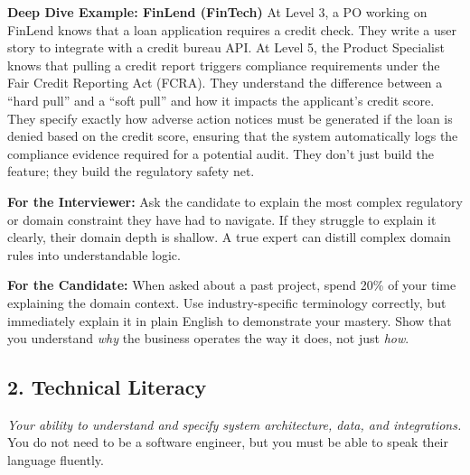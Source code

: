 \documentclass[
  11pt,
  openany,
  oneside]{book}
\renewenvironment{quote}{\begin{customquote}}{\end{customquote}}
\begin{document}
\textbf{Deep Dive Example: FinLend (FinTech)} At Level 3, a PO working
on FinLend knows that a loan application requires a credit check. They
write a user story to integrate with a credit bureau API. At Level 5,
the Product Specialist knows that pulling a credit report triggers
compliance requirements under the Fair Credit Reporting Act (FCRA). They
understand the difference between a ``hard pull'' and a ``soft pull''
and how it impacts the applicant's credit score. They specify exactly
how adverse action notices must be generated if the loan is denied based
on the credit score, ensuring that the system automatically logs the
compliance evidence required for a potential audit. They don't just
build the feature; they build the regulatory safety net.

\begin{quote}
\textbf{For the Interviewer:} Ask the candidate to explain the most
complex regulatory or domain constraint they have had to navigate. If
they struggle to explain it clearly, their domain depth is shallow. A
true expert can distill complex domain rules into understandable logic.
\end{quote}

\begin{quote}
\textbf{For the Candidate:} When asked about a past project, spend 20\%
of your time explaining the domain context. Use industry-specific
terminology correctly, but immediately explain it in plain English to
demonstrate your mastery. Show that you understand \emph{why} the
business operates the way it does, not just \emph{how}.
\end{quote}

\subsection{2. Technical Literacy}\label{technical-literacy}

\emph{Your ability to understand and specify system architecture, data,
and integrations.} You do not need to be a software engineer, but you
must be able to speak their language fluently.
\end{document}
